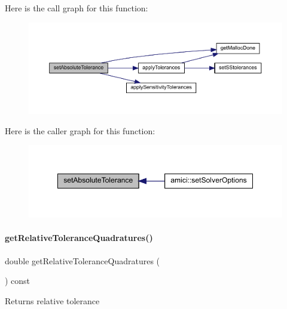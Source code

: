 Here is the call graph for this function\+:
\nopagebreak
\begin{figure}[H]
\begin{center}
\leavevmode
\includegraphics[width=350pt]{classamici_1_1_solver_afe0fd2fad6ce110ad8421f5979945f90_cgraph}
\end{center}
\end{figure}
Here is the caller graph for this function\+:
\nopagebreak
\begin{figure}[H]
\begin{center}
\leavevmode
\includegraphics[width=349pt]{classamici_1_1_solver_afe0fd2fad6ce110ad8421f5979945f90_icgraph}
\end{center}
\end{figure}
\mbox{\label{classamici_1_1_solver_a40124a6593fea7f5ddbf39385b021a9e}} 
\paragraph{\texorpdfstring{get\+Relative\+Tolerance\+Quadratures()}{getRelativeToleranceQuadratures()}}
{\footnotesize\ttfamily double get\+Relative\+Tolerance\+Quadratures (\begin{DoxyParamCaption}{ }\end{DoxyParamCaption}) const}

\begin{DoxyReturn}{Returns}
relative tolerance 
\end{DoxyReturn}


